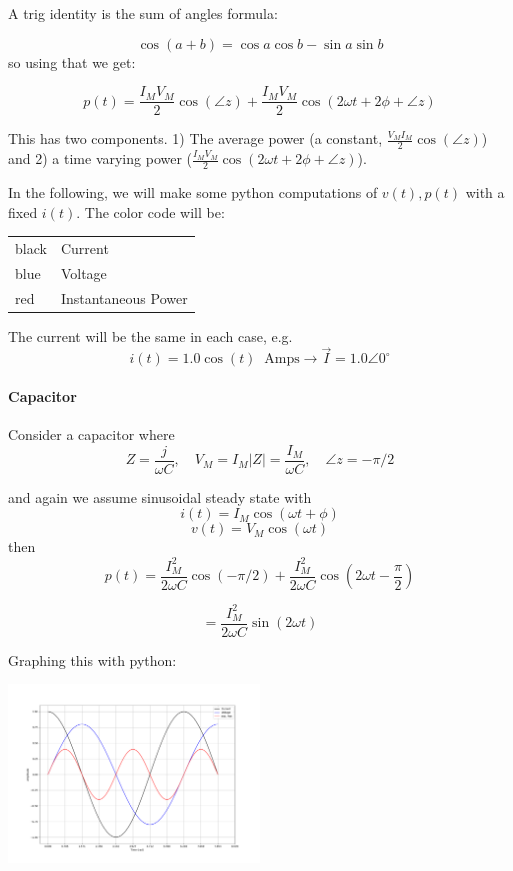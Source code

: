 \noindent A trig identity is the  sum of angles formula:

\[
\cos(a + b) = \cos a \cos b - \sin a \sin b
\]
so using that we get:

\[
p(t) = \frac{I_M V_M }{2} \cos(\angle z) + \frac{I_M V_M}{2} \cos(2\omega t + 2\phi + \angle z)
\]

This has two components.   1) The average power (a constant, $\frac{V_M I_M}{2} \cos(\angle z)$) and 2) a time varying power ($\frac{I_M V_M}{2} \cos(2\omega t + 2\phi + \angle z)$).

\vspace{0.3in}
In the following, we will make some python computations of $v(t), p(t)$
with a fixed $i(t)$.   The color code will be:
\begin{center}
\begin{tabular}{l|l}\hline
black  &  Current \\
blue   &  Voltage \\
red    &  Instantaneous Power \\
\end{tabular}
\end{center}
The current will be the same in each case, e.g.
\[
i(t) = 1.0\cos(t) \;\; \text{Amps} \to  \vec I = 1.0 \angle 0^\circ
\]

\paragraph{Capacitor}
Consider a capacitor where
\[
Z = \frac{j}{\omega C}, \quad V_M = I_M |Z| = \frac{I_M}{\omega C}, \quad \angle z = -\pi/2
\]

and again we assume
sinusoidal steady state with
\[
i(t) = I_M \cos(\omega t + \phi)
\]
\[
v(t) = V_M \cos(\omega t)
\]
then
\[
p(t) = \frac{I_M^2}{2\omega C} \cos(-\pi/2) + \frac{I_M^2}{2\omega C} \cos(2\omega t  - \frac{\pi}{2})
\]

\[
= \frac{I_M^2}{2\omega C} \sin(2\omega t  )
\]

Graphing this with python:

\includegraphics[width=0.5\textwidth]{figsChapt03/US73216.png}  %

